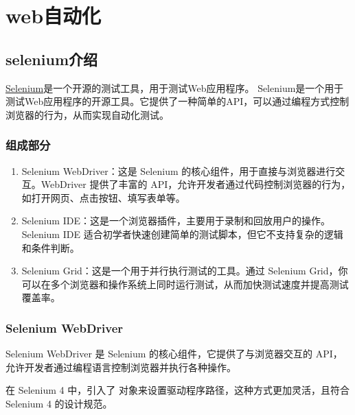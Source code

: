 \chapter{web自动化}
\section{selenium介绍}
\href{https://www.selenium.dev/}{Selenium}是一个开源的测试工具，用于测试Web应用程序。
Selenium是一个用于测试Web应用程序的开源工具。它提供了一种简单的API，可以通过编程方式控制浏览器的行为，从而实现自动化测试。

\subsection{组成部分}
\begin{enumerate}[label=\arabic*)]
    \item Selenium WebDriver：这是 Selenium 的核心组件，用于直接与浏览器进行交互。WebDriver 提供了丰富的 API，允许开发者通过代码控制浏览器的行为，如打开网页、点击按钮、填写表单等。
    \item Selenium IDE：这是一个浏览器插件，主要用于录制和回放用户的操作。Selenium IDE 适合初学者快速创建简单的测试脚本，但它不支持复杂的逻辑和条件判断。
    \item Selenium Grid：这是一个用于并行执行测试的工具。通过 Selenium Grid，你可以在多个浏览器和操作系统上同时运行测试，从而加快测试速度并提高测试覆盖率。
\end{enumerate}

\subsection{Selenium WebDriver}
Selenium WebDriver 是 Selenium 的核心组件，它提供了与浏览器交互的 API，允许开发者通过编程语言控制浏览器并执行各种操作。

在 Selenium 4 中，引入了  对象来设置驱动程序路径，这种方式更加灵活，且符合 Selenium 4 的设计规范。

